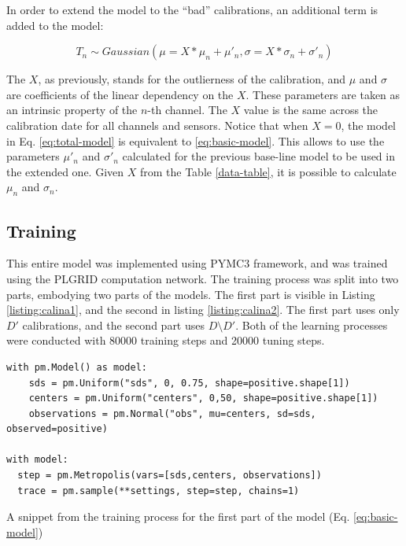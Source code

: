 In order to extend the model to the ``bad'' calibrations, an additional term is added to the model:

\begin{equation}
    \label{eq:total-model}
    T_n \sim Gaussian(\mu=X*\mu_n+\mu\prime_n, \sigma=X*\sigma_n+\sigma\prime_n)
\end{equation}

The $X$, as previously, stands for the outlierness of the calibration, and $\mu$ and $\sigma$ are coefficients of the linear dependency on the $X$.
These parameters are taken as an intrinsic property of the $n$-th channel.
The $X$ value is the same across the calibration date for all channels and sensors.
Notice that when $X=0$, the model in Eq. \ref{eq:total-model} is equivalent to \ref{eq:basic-model}.
This allows to use the parameters $\mu\prime_{n}$ and $\sigma\prime_{n}$ calculated for the previous base-line model to be used in the extended one.
Given $X$ from the Table \ref{data-table}, it is possible to calculate $\mu_{n}$ and $\sigma_{n}$.

\subsection{Training}
This entire model was implemented using PYMC3\cite{Salvatier2016} framework, and was trained using the PLGRID computation network.
The training process was split into two parts, embodying two parts of the models.
The first part is visible in Listing \ref{listing:calina1}, and the second in listing \ref{listing:calina2}.
The first part uses only $D\prime$ calibrations, and the second part uses $D \setminus D\prime$.
Both of the learning processes were conducted with 80000 training steps and 20000 tuning steps.

\begin{listing}[H]
\begin{verbatim}
with pm.Model() as model:
    sds = pm.Uniform("sds", 0, 0.75, shape=positive.shape[1])
    centers = pm.Uniform("centers", 0,50, shape=positive.shape[1])
    observations = pm.Normal("obs", mu=centers, sd=sds, observed=positive)

with model:
  step = pm.Metropolis(vars=[sds,centers, observations])
  trace = pm.sample(**settings, step=step, chains=1)
\end{verbatim}
\caption{A snippet from the training process for the first part of the model (Eq. \ref{eq:basic-model})}
\label{listing:calina1}
\end{listing}


